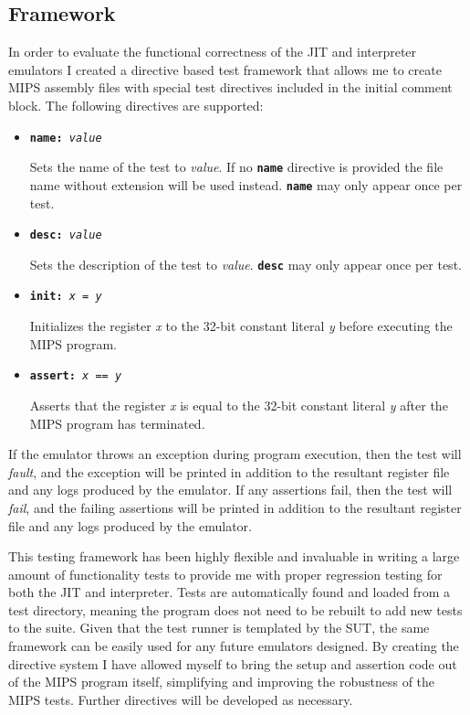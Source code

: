\subsection{Framework}

In order to evaluate the functional correctness of the JIT and interpreter emulators I created a directive based test framework that allows me to create MIPS assembly files with special test directives included in the initial comment block. The following directives are supported:

\begin{itemize}
    \item \texttt{\textbf{name:} \textit{value}}
    
    Sets the name of the test to \textit{value}. If no \texttt{\textbf{name}} directive is provided the file name without extension will be used instead. \texttt{\textbf{name}} may only appear once per test.

    \item \texttt{\textbf{desc:} \textit{value}}
    
    Sets the description of the test to \textit{value}. \texttt{\textbf{desc}} may only appear once per test.

    \item \texttt{\textbf{init:} \textit{x} = \textit{y}}
    
    Initializes the register \textit{x} to the 32-bit constant literal \textit{y} before executing the MIPS program.

    \item \texttt{\textbf{assert:} \textit{x} == \textit{y}}
    
    Asserts that the register \textit{x} is equal to the 32-bit constant literal \textit{y} after the MIPS program has terminated.
\end{itemize}

If the emulator throws an exception during program execution, then the test will \emph{fault}, and the exception will be printed in addition to the resultant register file and any logs produced by the emulator. If any assertions fail, then the test will \emph{fail}, and the failing assertions will be printed in addition to the resultant register file and any logs produced by the emulator.

This testing framework has been highly flexible and invaluable in writing a large amount of functionality tests to provide me with proper regression testing for both the JIT and interpreter. Tests are automatically found and loaded from a test directory, meaning the program does not need to be rebuilt to add new tests to the suite. Given that the test runner is templated by the SUT, the same framework can be easily used for any future emulators designed. By creating the directive system I have allowed myself to bring the setup and assertion code out of the MIPS program itself, simplifying and improving the robustness of the MIPS tests. Further directives will be developed as necessary.

